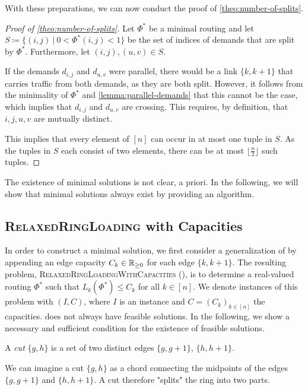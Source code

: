With these preparations, we can now conduct the proof of \cref{theo:number-of-splits}.
\begin{proof}[Proof of \cref{theo:number-of-splits}]
	Let $\Phi^\ast$ be a minimal routing and let $S \coloneqq \{(i, j)\ |\ 0 < \Phi^\ast(i, j) < 1\}$ be the set of indices of demands that are split by $\Phi^\ast$.
	Furthermore, let $(i, j), (u, v) \in S$.
	
	If the demands $d_{i,j}$ and $d_{u, v}$ were parallel, there would be a link $\{k, k+1\}$ that carries traffic from both demands, as they are both split.
	However, it follows from the minimality of $\Phi^\ast$ and \cref{lemma:parallel-demands} that this cannot be the case, which implies that $d_{i,j}$ and $d_{u, v}$ are crossing.
	This requires, by definition, that $i, j, u, v$ are mutually distinct.
	
	This implies that every element of $[n]$ can occur in at most one tuple in $S$.
	As the tuples in $S$ each consist of two elements, there can be at most $\lfloor\frac{n}{2}\rfloor$ such tuples.
\end{proof}

The existence of minimal solutions is not clear, a priori.
In the following, we will show that minimal solutions always exist by providing an algorithm.

\subsection{\textsc{RelaxedRingLoading} with Capacities}

In order to construct a minimal solution, we first consider a generalization of \RRL by appending an edge capacity $C_k \in \mathbb{R}_{\geq 0}$ for each edge $\{k, k+1\}$.
The resulting problem, \textsc{RelaxedRingLoadingWithCapacities} (\RRLWC), is to determine a real-valued routing $\Phi^\ast$ such that $L_k(\Phi^\ast) \leq C_k$ for all $k \in [n]$.
We denote instances of this problem with $(I, C)$, where $I$ is an \RRL instance and $C = (C_k)_{k \in [n]}$ the capacities.
\RRLWC does not always have feasible solutions.
In the following, we show a necessary and sufficient condition for the existence of feasible solutions.

\begin{definition}
	A \emph{cut} $\{g, h\}$ is a set of two distinct edges $\{g, g+1\}$, $\{h, h+1\}$.
\end{definition}

We can imagine a cut $\{g, h\}$ as a chord connecting the midpoints of the edges $\{g, g+1\}$ and $\{h, h+1\}$.
A cut therefore "splits" the ring into two parts.

